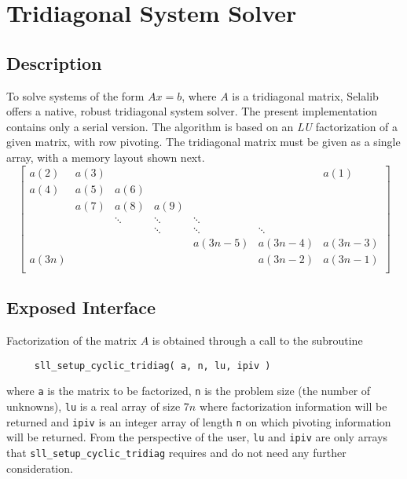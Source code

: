 \documentclass[]{report}   %
\begin{document}
\section{Tridiagonal System Solver}
\subsection{Description}
To solve systems of the form $Ax=b$, where $A$ is a tridiagonal matrix, Selalib offers a native, robust tridiagonal system solver. The present implementation contains only a serial version. The algorithm is based on an \emph{LU} factorization of a given matrix, with row pivoting. The tridiagonal matrix must be given as a single array, with a memory layout shown next.
\begin{equation*}
  \begin{bmatrix}
    a(2) & a(3) &        &        &        &        &  a(1) \\
    a(4) & a(5) & a(6)   &        &        &        &       \\
         & a(7) & a(8)   & a(9)   &        &        &       \\
         &      & \ddots & \ddots & \ddots &        &       \\
         &      &        & \ddots & \ddots & \ddots &       \\
         &      &        &        & a(3n-5)& a(3n-4)&a(3n-3)\\
    a(3n)&      &        &        &        & a(3n-2)&a(3n-1)\\
  \end{bmatrix}
\end{equation*}

\subsection{Exposed Interface}
Factorization of the matrix $A$ is obtained through a call to the subroutine
\begin{verbatim}
     sll_setup_cyclic_tridiag( a, n, lu, ipiv )
\end{verbatim}
where \verb+a+ is the matrix to be factorized, \verb+n+ is the problem size (the number of unknowns), \verb+lu+ is a real array of size $7n$ where factorization information will be returned and \verb+ipiv+ is an integer array of length \verb+n+ on which pivoting information will be returned. From the perspective of the user, \verb+lu+ and \verb+ipiv+ are only arrays that \verb+sll_setup_cyclic_tridiag+ requires and do not need any further consideration.
\end{document}
